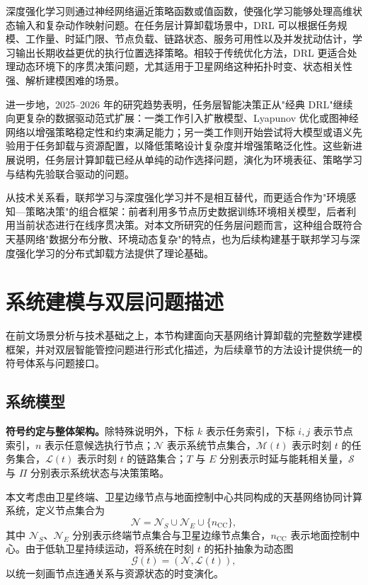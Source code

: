 深度强化学习则通过神经网络逼近策略函数或值函数，使强化学习能够处理高维状态输入和复杂动作映射问题。在任务层计算卸载场景中，DRL 可以根据任务规模、工作量、时延门限、节点负载、链路状态、服务可用性以及并发扰动估计，学习输出长期收益更优的执行位置选择策略\cite{Zhou2024MobilityAware,Zhong2025HeterogeneousTVT,Fan2025SEI}。相较于传统优化方法，DRL 更适合处理动态环境下的序贯决策问题，尤其适用于卫星网络这种拓扑时变、状态相关性强、解析建模困难的场景。

进一步地，2025--2026 年的研究趋势表明，任务层智能决策正从"经典 DRL"继续向更复杂的数据驱动范式扩展：一类工作引入扩散模型、Lyapunov 优化或图神经网络以增强策略稳定性和约束满足能力\cite{Rao2025DiffusionLyapunov}；另一类工作则开始尝试将大模型或语义先验用于任务卸载与资源配置，以降低策略设计复杂度并增强策略泛化性\cite{Sun2026LLMOffloading}。这些新进展说明，任务层计算卸载已经从单纯的动作选择问题，演化为环境表征、策略学习与结构先验联合驱动的问题。

从技术关系看，联邦学习与深度强化学习并不是相互替代，而更适合作为"环境感知—策略决策"的组合框架：前者利用多节点历史数据训练环境相关模型，后者利用当前状态进行在线序贯决策。对本文所研究的任务层问题而言，这种组合既符合天基网络"数据分布分散、环境动态复杂"的特点，也为后续构建基于联邦学习与深度强化学习的分布式卸载方法提供了理论基础。

\section{系统建模与双层问题描述}

在前文场景分析与技术基础之上，本节构建面向天基网络计算卸载的完整数学建模框架，并对双层智能管控问题进行形式化描述，为后续章节的方法设计提供统一的符号体系与问题接口。

\subsection{系统模型}

\textbf{符号约定与整体架构。}除特殊说明外，下标 $k$ 表示任务索引，下标 $i,j$ 表示节点索引，$n$ 表示任意候选执行节点；$\mathcal{N}$ 表示系统节点集合，$\mathcal{M}(t)$ 表示时刻 $t$ 的任务集合，$\mathcal{L}(t)$ 表示时刻 $t$ 的链路集合；$T$ 与 $E$ 分别表示时延与能耗相关量，$\mathcal{S}$ 与 $\Pi$ 分别表示系统状态与决策策略。

本文考虑由卫星终端、卫星边缘节点与地面控制中心共同构成的天基网络协同计算系统，定义节点集合为
\begin{equation}
  \mathcal{N}=\mathcal{N}_{S}\cup \mathcal{N}_{E}\cup \{n_{\mathrm{CC}}\},
\end{equation}
其中 $\mathcal{N}_{S}$、$\mathcal{N}_{E}$ 分别表示终端节点集合与卫星边缘节点集合，$n_{\mathrm{CC}}$ 表示地面控制中心。由于低轨卫星持续运动，将系统在时刻 $t$ 的拓扑抽象为动态图
\begin{equation}
  \mathcal{G}(t)=\left(\mathcal{N},\mathcal{L}(t)\right),
\end{equation}
以统一刻画节点连通关系与资源状态的时变演化。

